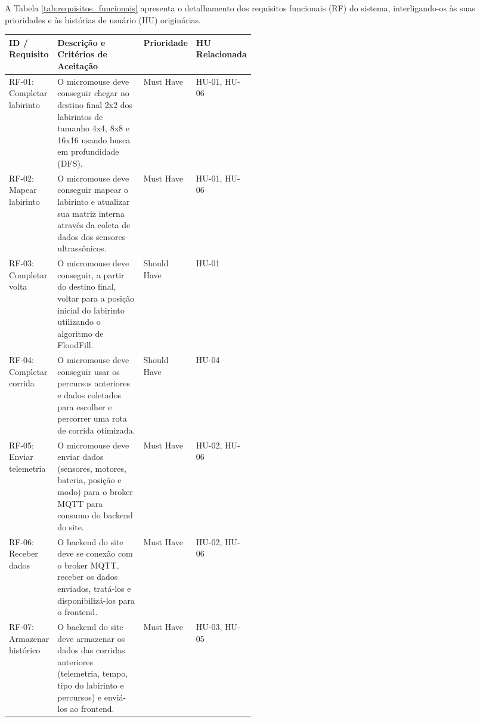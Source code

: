 A Tabela \ref{tab:requisitos_funcionais} apresenta o detalhamento dos requisitos funcionais (RF) do sistema, interligando-os às suas prioridades e às histórias de usuário (HU) originárias.

\begin{table}[H]
    \centering
    \small
    \renewcommand{\arraystretch}{1.3}
    \begin{tabularx}{\linewidth}{|>{\raggedright\arraybackslash}p{0.18\linewidth}|X|>{\centering\arraybackslash}p{0.14\linewidth}|>{\centering\arraybackslash}p{0.16\linewidth}|}
        \hline
        \textbf{ID / Requisito} & \textbf{Descrição e Critérios de Aceitação} & \textbf{Prioridade} & \textbf{HU Relacionada} \\ \hline
        
        RF-01: Completar labirinto & O micromouse deve conseguir chegar no destino final 2x2 dos labirintos de tamanho 4x4, 8x8 e 16x16 usando busca em profundidade (DFS). & Must Have & HU-01, HU-06 \\ \hline
        
        RF-02: Mapear labirinto & O micromouse deve conseguir mapear o labirinto e atualizar sua matriz interna através da coleta de dados dos sensores ultrassônicos. & Must Have & HU-01, HU-06 \\ \hline
        
        RF-03: Completar volta & O micromouse deve conseguir, a partir do destino final, voltar para a posição inicial do labirinto utilizando o algoritmo de FloodFill. & Should Have & HU-01 \\ \hline
        
        RF-04: Completar corrida & O micromouse deve conseguir usar os percursos anteriores e dados coletados para escolher e percorrer uma rota de corrida otimizada. & Should Have & HU-04 \\ \hline
        
        RF-05: Enviar telemetria & O micromouse deve enviar dados (sensores, motores, bateria, posição e modo) para o broker MQTT para consumo do backend do site. & Must Have & HU-02, HU-06 \\ \hline
        
        RF-06: Receber dados & O backend do site deve se conexão com o broker MQTT, receber os dados enviados, tratá-los e disponibilizá-los para o frontend. & Must Have & HU-02, HU-06 \\ \hline
        
        RF-07: Armazenar histórico & O backend do site deve armazenar os dados das corridas anteriores (telemetria, tempo, tipo do labirinto e percursos) e enviá-los ao frontend. & Must Have & HU-03, HU-05 \\ \hline
        

\end{tabularx}
\end{table}
